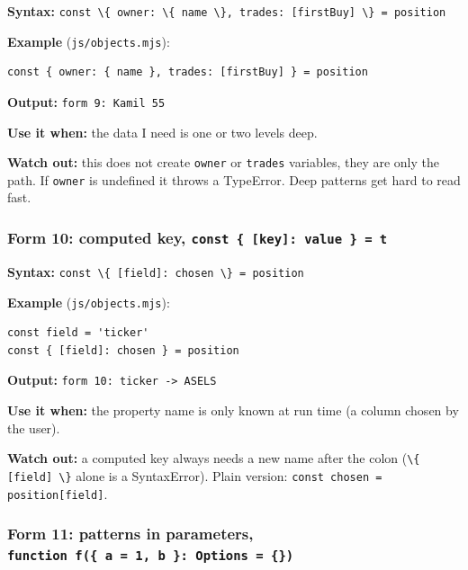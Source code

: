 \documentclass[
  11pt,
]{article}
\newcommand{\passthrough}[1]{#1}
\begin{document}
\textbf{Syntax:}
\passthrough{\lstinline!const \{ owner: \{ name \}, trades: [firstBuy] \} = position!}

\textbf{Example} (\passthrough{\lstinline!js/objects.mjs!}):

\begin{lstlisting}
const { owner: { name }, trades: [firstBuy] } = position
\end{lstlisting}

\textbf{Output:} \passthrough{\lstinline!form 9: Kamil 55!}

\textbf{Use it when:} the data I need is one or two levels deep.

\textbf{Watch out:} this does not create \passthrough{\lstinline!owner!}
or \passthrough{\lstinline!trades!} variables, they are only the path.
If \passthrough{\lstinline!owner!} is undefined it throws a TypeError.
Deep patterns get hard to read fast.

\subsubsection{\texorpdfstring{Form 10: computed key,
\texttt{const\ \{\ {[}key{]}:\ value\ \}\ =\ t}}{Form 10: computed key, const \{ {[}key{]}: value \} = t}}\label{form-10-computed-key-const-key-value-t}

\textbf{Syntax:}
\passthrough{\lstinline!const \{ [field]: chosen \} = position!}

\textbf{Example} (\passthrough{\lstinline!js/objects.mjs!}):

\begin{lstlisting}
const field = 'ticker'
const { [field]: chosen } = position
\end{lstlisting}

\textbf{Output:} \passthrough{\lstinline!form 10: ticker -> ASELS!}

\textbf{Use it when:} the property name is only known at run time (a
column chosen by the user).

\textbf{Watch out:} a computed key always needs a new name after the
colon (\passthrough{\lstinline!\{ [field] \}!} alone is a SyntaxError).
Plain version: \passthrough{\lstinline!const chosen = position[field]!}.

\subsubsection{\texorpdfstring{Form 11: patterns in parameters,
\texttt{function\ f(\{\ a\ =\ 1,\ b\ \}:\ Options\ =\ \{\})}}{Form 11: patterns in parameters, function f(\{ a = 1, b \}: Options = \{\})}}\label{form-11-patterns-in-parameters-function-f-a-1-b-options}
\end{document}

